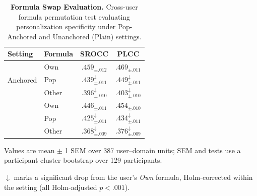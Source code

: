 \begin{table}[t]
\centering
\small
\setlength{\tabcolsep}{6pt}
\renewcommand{\arraystretch}{0.95}
\begin{threeparttable}
\caption{\textbf{Formula Swap Evaluation.} Cross-user formula permutation test evaluating personalization specificity under Pop-Anchored and Unanchored (Plain) settings.}
\label{tab:formula_swap}
\begin{tabular}{ll cc}
\toprule
Setting & Formula & SROCC & PLCC \\
\midrule
\multirow{3}{*}{Anchored} 
& Own    & $\bm{.459_{\pm .012}}$ & $\bm{.469_{\pm .011}}$ \\
& Pop    & $.439_{\pm .011}^\downarrow$ & $.449_{\pm .011}^\downarrow$ \\
& Other  & $.396_{\pm .010}^\downarrow$ & $.403_{\pm .010}^\downarrow$ \\
\addlinespace
\multirow{3}{*}{Unanchored} 
& Own    & $.446_{\pm .011}$ & $.454_{\pm .010}$  \\
& Pop    & $.425_{\pm .011}^\downarrow$ & $.434_{\pm .011}^\downarrow$ \\
& Other  & $.368_{\pm .009}^\downarrow$ & $.376_{\pm .009}^\downarrow$ \\
\bottomrule
\end{tabular}
\begin{tablenotes}[flushleft]\footnotesize
    \item Values are mean $\pm$ 1 SEM over 387 user--domain units; SEM and tests use a participant-cluster bootstrap over 129 participants.
    \item $\downarrow$ marks a significant drop from the user's \emph{Own} formula, Holm-corrected within the setting (all Holm-adjusted $p<.001$).
\end{tablenotes}
\end{threeparttable}
\end{table}
